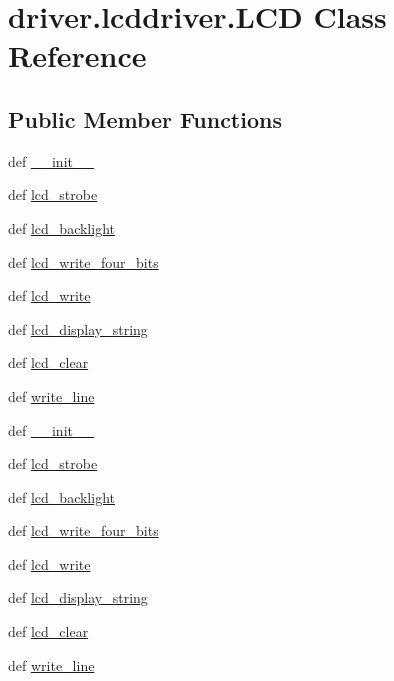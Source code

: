 \hypertarget{classdriver_1_1lcddriver_1_1LCD}{}\section{driver.\+lcddriver.\+L\+C\+D Class Reference}
\label{classdriver_1_1lcddriver_1_1LCD}
\subsection*{Public Member Functions}
\begin{DoxyCompactItemize}
\item 
def \hyperlink{classdriver_1_1lcddriver_1_1LCD_a64d4c8185093f73c7c5ab6979396ed8c}{\+\_\+\+\_\+init\+\_\+\+\_\+}
\item 
def \hyperlink{classdriver_1_1lcddriver_1_1LCD_a596a7bb9c9fa633b6e5890886f40a07f}{lcd\+\_\+strobe}
\item 
def \hyperlink{classdriver_1_1lcddriver_1_1LCD_ab01c3cddd70d0812a0703aa65eede3e4}{lcd\+\_\+backlight}
\item 
def \hyperlink{classdriver_1_1lcddriver_1_1LCD_abbda7dc71e106248dd905d4a2b14c935}{lcd\+\_\+write\+\_\+four\+\_\+bits}
\item 
def \hyperlink{classdriver_1_1lcddriver_1_1LCD_a27bd6dcf5856e68ef269a70ca6d8557d}{lcd\+\_\+write}
\item 
def \hyperlink{classdriver_1_1lcddriver_1_1LCD_a0458faa2d341063ea03b2124fe8166df}{lcd\+\_\+display\+\_\+string}
\item 
def \hyperlink{classdriver_1_1lcddriver_1_1LCD_aca18a41a4d0e8c71dd5e8f908dc51329}{lcd\+\_\+clear}
\item 
def \hyperlink{classdriver_1_1lcddriver_1_1LCD_a7fffd68b641188b78a2876d5f04810db}{write\+\_\+line}
\item 
def \hyperlink{classdriver_1_1lcddriver_1_1LCD_a64d4c8185093f73c7c5ab6979396ed8c}{\+\_\+\+\_\+init\+\_\+\+\_\+}
\item 
def \hyperlink{classdriver_1_1lcddriver_1_1LCD_a596a7bb9c9fa633b6e5890886f40a07f}{lcd\+\_\+strobe}
\item 
def \hyperlink{classdriver_1_1lcddriver_1_1LCD_ab01c3cddd70d0812a0703aa65eede3e4}{lcd\+\_\+backlight}
\item 
def \hyperlink{classdriver_1_1lcddriver_1_1LCD_abbda7dc71e106248dd905d4a2b14c935}{lcd\+\_\+write\+\_\+four\+\_\+bits}
\item 
def \hyperlink{classdriver_1_1lcddriver_1_1LCD_a27bd6dcf5856e68ef269a70ca6d8557d}{lcd\+\_\+write}
\item 
def \hyperlink{classdriver_1_1lcddriver_1_1LCD_a0458faa2d341063ea03b2124fe8166df}{lcd\+\_\+display\+\_\+string}
\item 
def \hyperlink{classdriver_1_1lcddriver_1_1LCD_aca18a41a4d0e8c71dd5e8f908dc51329}{lcd\+\_\+clear}
\item 
def \hyperlink{classdriver_1_1lcddriver_1_1LCD_a7fffd68b641188b78a2876d5f04810db}{write\+\_\+line}
\end{DoxyCompactItemize}
